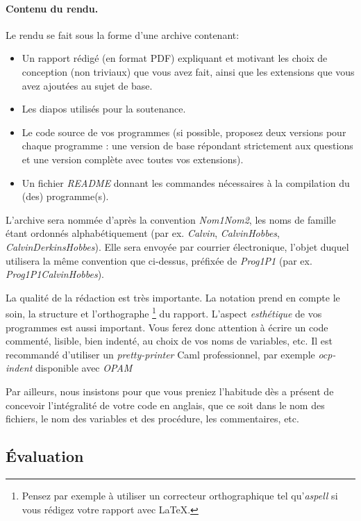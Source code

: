 \documentclass{../../../LaTeX/tdsimple}
\begin{document}
\paragraph{Contenu du rendu.}
Le rendu se fait sous la forme d'une archive contenant:
\begin{itemize}
\item Un rapport rédigé (en format PDF) expliquant et motivant les
  choix de conception (non triviaux) que vous avez fait, ainsi que les
  extensions que vous avez ajoutées au sujet de base.
\item Les diapos utilisés pour la soutenance.
\item Le code source de vos programmes (si possible, proposez deux
  versions pour chaque programme : une version de base répondant
  strictement aux questions et une version complète avec toutes vos
  extensions).
\item Un fichier \emph{README} donnant les commandes nécessaires à la
  compilation du (des) programme(s).
\end{itemize}
L'archive sera nommée d'après la convention \emph{Nom1Nom2}, les
noms de famille étant ordonnés alphabétiquement (par ex.
\emph{Calvin}, \emph{CalvinHobbes}, \emph{CalvinDerkinsHobbes}). Elle
sera envoyée par courrier électronique, l'objet duquel utilisera la
même convention que ci-dessus, préfixée de \emph{Prog1P1} (par
ex. \emph{Prog1P1CalvinHobbes}).

\begin{remarque}
  La qualité de la rédaction est très importante.  La notation prend
  en compte le soin, la structure et l'orthographe%
  \footnote{Pensez par exemple à utiliser un correcteur orthographique
    tel qu'\emph{aspell} si vous rédigez votre rapport avec \LaTeX.}
  du rapport.  L'aspect \emph{esthétique} de vos programmes est aussi
  important. Vous ferez donc attention à écrire un code commenté,
  lisible, bien indenté, au choix de vos noms de variables, etc. Il
  est recommandé d'utiliser un \emph{pretty-printer} Caml
  professionnel, par exemple \emph{ocp-indent} disponible avec \emph{OPAM}

  Par ailleurs, nous insistons pour que vous preniez l'habitude dès a
  présent de concevoir l'intégralité de votre code en anglais, que ce soit
  dans le nom des fichiers, le nom des variables et des procédure, les
  commentaires, etc. 
\end{remarque}

\subsection*{Évaluation}
\end{document}
